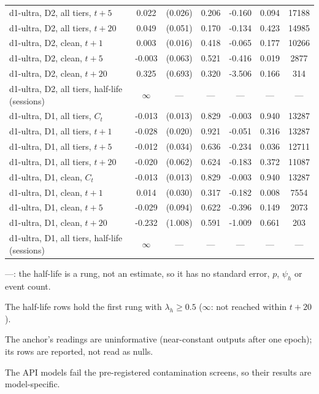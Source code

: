 \begin{longtable}{@{}lS[table-format=-1.3]S[table-format=1.3, table-space-text-pre=(, table-space-text-post=)]S[table-format=1.3]S[table-format=-1.3]S[table-format=1.3]S[table-format=5.0]@{}}
d1-ultra, D2, all tiers, $t{+}5$ & 0.022 & {(}0.026{)} & 0.206 & -0.160 & 0.094 & 17188 \\
d1-ultra, D2, all tiers, $t{+}20$ & 0.049 & {(}0.051{)} & 0.170 & -0.134 & 0.423 & 14985 \\
d1-ultra, D2, clean, $t{+}1$ & 0.003 & {(}0.016{)} & 0.418 & -0.065 & 0.177 & 10266 \\
d1-ultra, D2, clean, $t{+}5$ & -0.003 & {(}0.063{)} & 0.521 & -0.416 & 0.019 & 2877 \\
d1-ultra, D2, clean, $t{+}20$ & 0.325 & {(}0.693{)} & 0.320 & -3.506 & 0.166 & 314 \\
d1-ultra, D2, all tiers, half-life (sessions) & {$\infty$} & {---} & {---} & {---} & {---} & {---} \\
d1-ultra, D1, all tiers, $C_t$ & -0.013 & {(}0.013{)} & 0.829 & -0.003 & 0.940 & 13287 \\
d1-ultra, D1, all tiers, $t{+}1$ & -0.028 & {(}0.020{)} & 0.921 & -0.051 & 0.316 & 13287 \\
d1-ultra, D1, all tiers, $t{+}5$ & -0.012 & {(}0.034{)} & 0.636 & -0.234 & 0.036 & 12711 \\
d1-ultra, D1, all tiers, $t{+}20$ & -0.020 & {(}0.062{)} & 0.624 & -0.183 & 0.372 & 11087 \\
d1-ultra, D1, clean, $C_t$ & -0.013 & {(}0.013{)} & 0.829 & -0.003 & 0.940 & 13287 \\
d1-ultra, D1, clean, $t{+}1$ & 0.014 & {(}0.030{)} & 0.317 & -0.182 & 0.008 & 7554 \\
d1-ultra, D1, clean, $t{+}5$ & -0.029 & {(}0.094{)} & 0.622 & -0.396 & 0.149 & 2073 \\
d1-ultra, D1, clean, $t{+}20$ & -0.232 & {(}1.008{)} & 0.591 & -1.009 & 0.661 & 203 \\
d1-ultra, D1, all tiers, half-life (sessions) & {$\infty$} & {---} & {---} & {---} & {---} & {---} \\
\end{longtable}
\endgroup
\vspace{-0.5\baselineskip}
{\footnotesize\raggedright
---: the half-life is a rung, not an estimate, so it has no standard error, $p$, $\psi_h$ or event count.\par
The half-life rows hold the first rung with $\lambda_h \geq 0.5$ ($\infty$: not reached within $t{+}20$).\par
The anchor's readings are uninformative (near-constant outputs after one epoch); its rows are reported, not read as nulls.\par
The API models fail the pre-registered contamination screens, so their results are model-specific.\par
}
